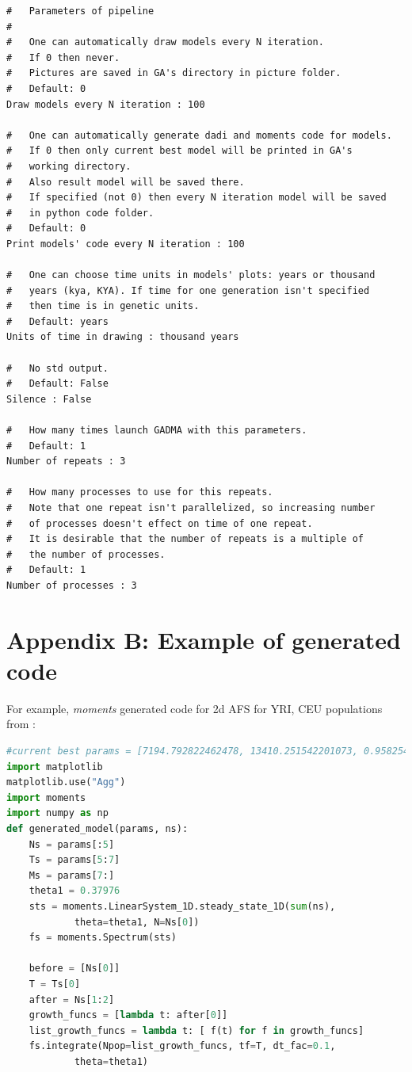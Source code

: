 \documentclass[12pt]{article}
\newcommand{\moments}{\textit{moments}\xspace}
\begin{document}
\begin{appendices}
\begin{lstlisting}
#   Parameters of pipeline
#
#   One can automatically draw models every N iteration. 
#   If 0 then never.
#   Pictures are saved in GA's directory in picture folder.
#   Default: 0
Draw models every N iteration : 100

#   One can automatically generate dadi and moments code for models.
#   If 0 then only current best model will be printed in GA's 
#   working directory.
#   Also result model will be saved there. 
#   If specified (not 0) then every N iteration model will be saved
#   in python code folder.
#   Default: 0
Print models' code every N iteration : 100

#   One can choose time units in models' plots: years or thousand 
#   years (kya, KYA). If time for one generation isn't specified 
#   then time is in genetic units.
#   Default: years
Units of time in drawing : thousand years

#   No std output.
#   Default: False
Silence : False

#   How many times launch GADMA with this parameters.
#   Default: 1
Number of repeats : 3

#   How many processes to use for this repeats.
#   Note that one repeat isn't parallelized, so increasing number
#   of processes doesn't effect on time of one repeat.
#   It is desirable that the number of repeats is a multiple of 
#   the number of processes.
#   Default: 1
Number of processes : 3
\end{lstlisting}

\section{Appendix B: Example of generated code}
\label{sec:ex-gen-code}
For example, \moments generated code for 2d AFS for YRI, CEU populations from \cite{gutenkunst2009}:

\begin{lstlisting}[language=Python]
#current best params = [7194.792822462478, 13410.251542201073, 0.9582544565961783, 13542.979276844108, 12114.968575519626, 2683.3787253409746, 846.6668954957415, 0.00014172779289593632, 0.00012195685425105608]
import matplotlib
matplotlib.use("Agg")
import moments
import numpy as np
def generated_model(params, ns):
	Ns = params[:5]
	Ts = params[5:7]
	Ms = params[7:]
	theta1 = 0.37976
	sts = moments.LinearSystem_1D.steady_state_1D(sum(ns), 
	        theta=theta1, N=Ns[0])
	fs = moments.Spectrum(sts)

	before = [Ns[0]]
	T = Ts[0]
	after = Ns[1:2]
	growth_funcs = [lambda t: after[0]]
	list_growth_funcs = lambda t: [ f(t) for f in growth_funcs]
	fs.integrate(Npop=list_growth_funcs, tf=T, dt_fac=0.1, 
	        theta=theta1)


\end{lstlisting}
\end{appendices}
\end{document}
